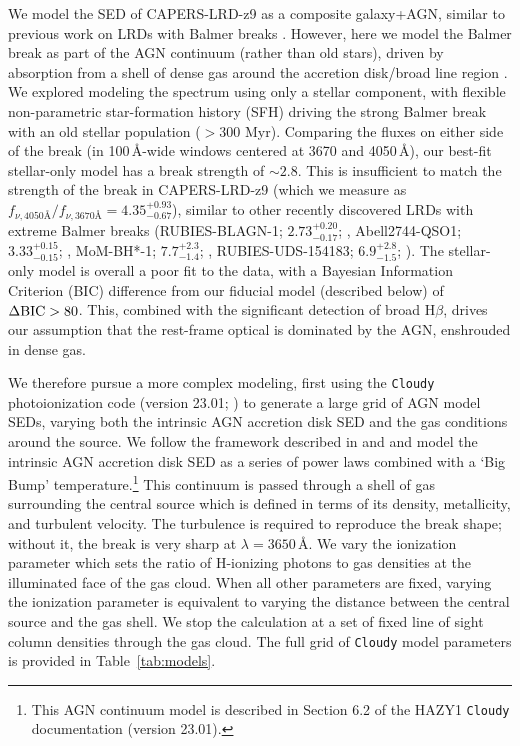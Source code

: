 \documentclass[twocolumn]{aastex7}
\newcommand{\src}{CAPERS-LRD-z9}
\begin{document}
We model the SED of \src{} as a composite galaxy+AGN, similar to previous work on LRDs with Balmer breaks \citep[e.g.][]{wang24,labbe24}. However, here we model the Balmer break as part of the AGN continuum (rather than old stars), driven by absorption from a shell of dense gas around the accretion disk/broad line region \citep[BLR; e.g.][]{inayoshi25, ji25, naidu25}. 
We explored modeling the spectrum using only a stellar component, with flexible non-parametric star-formation history (SFH) driving the strong Balmer break with an old stellar population ($>300$ Myr). 
Comparing the fluxes on either side of the break (in 100\,\AA-wide windows centered at 3670 and 4050\,\AA), our best-fit stellar-only model has a break strength of $\sim 2.8$.
This is insufficient to match the strength of the break in \src{} (which we measure as $f_{\nu,4050\textrm{\AA{}}}/f_{\nu,3670\textrm{\AA{}}}=4.35^{+0.93}_{-0.67}$), similar to other recently discovered LRDs with extreme Balmer breaks (RUBIES-BLAGN-1; $2.73^{+0.20}_{-0.17}$; \citealt{wang24a}, Abell2744-QSO1; $3.33^{+0.15}_{-0.15}$; \citealt{weibel25,ma25}, MoM-BH*-1; $7.7^{+2.3}_{-1.4}$; \citealt{naidu25}, RUBIES-UDS-154183; $6.9^{+2.8}_{-1.5}$; \citealt{degraaff25}).
The stellar-only model is overall a poor fit to the data, with a Bayesian Information Criterion (BIC) difference from our fiducial model (described below) of $\Delta{\rm BIC} > 80$. 
This, combined with the significant detection of broad H$\beta$, drives our assumption that the rest-frame optical is dominated by the AGN, enshrouded in dense gas.

We therefore pursue a more complex modeling, first using the \texttt{Cloudy} photoionization code (version 23.01; \citealp{cloudy23}) to generate a large grid of AGN model SEDs, varying both the intrinsic AGN accretion disk SED and the gas conditions around the source. We follow the framework described in \cite{inayoshi25} and \cite{naidu25} and model the intrinsic AGN accretion disk SED as a series of power laws combined with a `Big Bump' temperature.\footnote{This AGN continuum model is described in Section 6.2 of the HAZY1 \texttt{Cloudy} documentation (version 23.01).} This continuum is passed through a shell of gas surrounding the central source which is defined in terms of its density, metallicity, and turbulent velocity. The turbulence is required to reproduce the break shape; without it, the break is very sharp at $\lambda = 3650$\,\AA. We vary the ionization parameter which sets the ratio of H-ionizing photons to gas densities at the illuminated face of the gas cloud. When all other parameters are fixed, varying the ionization parameter is equivalent to varying the distance between the central source and the gas shell. We stop the calculation at a set of fixed line of sight column densities through the gas cloud. The full grid of \texttt{Cloudy} model parameters is provided in Table~\ref{tab:models}. 
\end{document}
